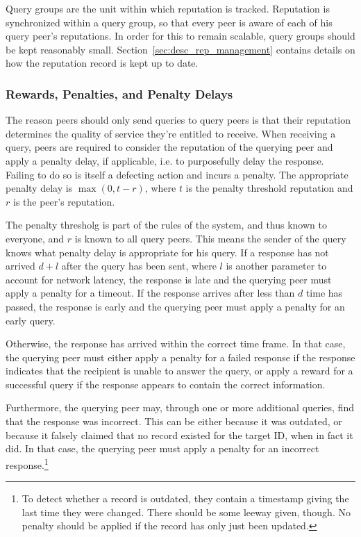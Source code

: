 Query groups are the unit within which reputation is tracked. Reputation is
synchronized within a query group, so that every peer is aware of each of his
query peer's reputations. In order for this to remain scalable, query groups
should be kept reasonably small. Section~\ref{sec:desc_rep_management} contains
details on how the reputation record is kept up to date.

\subsubsection{Rewards, Penalties, and Penalty Delays}
The reason peers should only send queries to query peers is that their
reputation determines the quality of service they're entitled to receive. When
receiving a query, peers are required to consider the reputation of the querying
peer and apply a penalty delay, if applicable, i.e. to purposefully delay the
response. Failing to do so is itself a defecting action and incurs a penalty.
The appropriate penalty delay is $\max(0, t - r)$, where $t$ is the penalty
threshold reputation and $r$ is the peer's reputation.

The penalty thresholg is part of the rules of the system, and thus known to
everyone, and $r$ is known to all query peers. This means the sender of the
query knows what penalty delay is appropriate for his query. If a response has
not arrived $d + l$ after the query has been sent, where $l$ is another
parameter to account for network latency, the response is late and the querying
peer must apply a penalty for a timeout. If the response arrives after less than
$d$ time has passed, the response is early and the querying peer must apply a
penalty for an early query.

Otherwise, the response has arrived within the correct time frame. In that case,
the querying peer must either apply a penalty for a failed response if the
response indicates that the recipient is unable to answer the query, or apply a
reward for a successful query if the response appears to contain the correct
information.

Furthermore, the querying peer may, through one or more additional queries, find
that the response was incorrect. This can be either because it was outdated, or
because it falsely claimed that no record existed for the target ID, when in
fact it did. In that case, the querying peer must apply a penalty for an
incorrect response.\footnote{To detect whether a record is outdated, they
contain a timestamp giving the last time they were changed. There should be some
leeway given, though. No penalty should be applied if the record has only just
been updated.}

